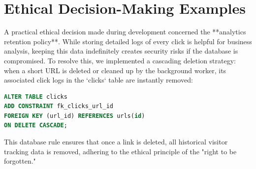 \section{Ethical Decision-Making Examples}
A practical ethical decision made during development concerned the **analytics retention policy**. While storing detailed logs of every click is helpful for business analysis, keeping this data indefinitely creates security risks if the database is compromised. 
To resolve this, we implemented a cascading deletion strategy: when a short URL is deleted or cleaned up by the background worker, its associated click logs in the `clicks` table are instantly removed:
\begin{lstlisting}[language=SQL]
ALTER TABLE clicks 
ADD CONSTRAINT fk_clicks_url_id 
FOREIGN KEY (url_id) REFERENCES urls(id) 
ON DELETE CASCADE;
\end{lstlisting}
This database rule ensures that once a link is deleted, all historical visitor tracking data is removed, adhering to the ethical principle of the "right to be forgotten."

